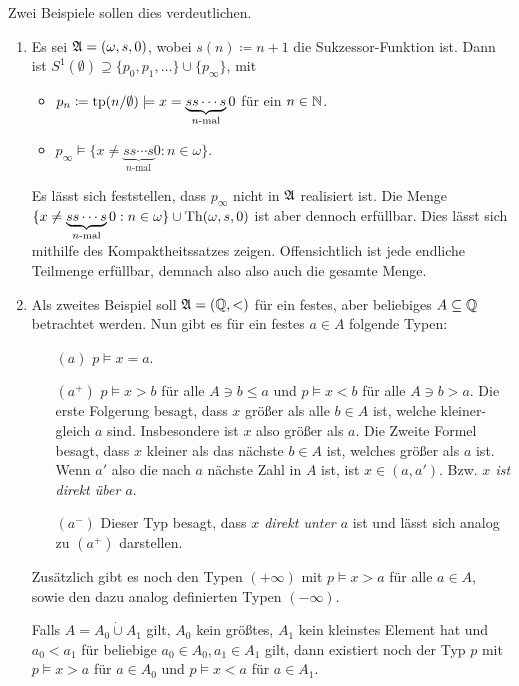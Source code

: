 Zwei Beispiele sollen dies verdeutlichen.
\begin{example}
\begin{enumerate}
	\item Es sei $\mathfrak{A}=(\omega,s,0)$, wobei $s(n)\coloneqq n+1$ die Sukzessor-Funktion ist. Dann ist $S^1(\emptyset)\supseteq\{p_0,p_1,\dots\}\cup\{p_\infty\}$, mit
	\begin{itemize}
		\item $p_n\coloneqq \operatorname{tp}(n/\emptyset)\models x=\underbrace{ss\cdots s}_{n\text{-mal}}0$ für ein $n\in \mathbb{N}$.
		\item $p_\infty\models\{x\neq\underbrace{ss\cdots s}_{n\text{-mal}}0 : n\in\omega\}$.
	\end{itemize}
	Es lässt sich feststellen, dass $p_\infty$ nicht in $\mathfrak{A}$ realisiert ist. Die Menge $\{x\neq\underbrace{ss\cdots s}_{n\text{-mal}}0 : n\in\omega\}\cup \operatorname{Th}(\omega,s,0)$ ist aber dennoch erfüllbar. Dies lässt sich mithilfe des Kompaktheitssatzes zeigen. Offensichtlich ist jede endliche Teilmenge erfüllbar, demnach also also auch die gesamte Menge.
	
	\item Als zweites Beispiel soll $\mathfrak{A}=(\mathbb{Q},<)$ für ein festes, aber beliebiges $A\subseteq \mathbb{Q}$ betrachtet werden. Nun gibt es für ein festes $a\in A$ folgende Typen:
	\begin{itemize}
		\item[$(a)$] $p\models x=a$.
		\item[$(a^+)$] $p\models x>b$ für alle $A\ni b\leq a$ und $p\models x<b$ für alle $A\ni b>a$. Die erste Folgerung besagt, dass $x$ größer als alle $b\in A$ ist, welche kleiner-gleich $a$ sind. Insbesondere ist $x$ also größer als $a$. Die Zweite Formel besagt, dass $x$ kleiner als das nächste $b\in A$ ist, welches größer als $a$ ist. Wenn $a'$ also die nach $a$ nächste Zahl in $A$ ist, ist $x\in(a,a')$. Bzw. \textit{$x$ ist direkt über $a$}.
		\item[$(a^-)$] Dieser Typ besagt, dass \textit{$x$ direkt unter $a$} ist und lässt sich analog zu $(a^+)$ darstellen.
	\end{itemize}
	Zusätzlich gibt es noch den Typen $(+\infty)$ mit $p\models x>a$ für alle $a\in A$, sowie den dazu analog definierten Typen $(-\infty)$.
	
	Falls $A=A_0\dot{\cup}A_1$ gilt, $A_0$ kein größtes, $A_1$ kein kleinstes Element hat und $a_0<a_1$ für beliebige $a_0\in A_0,a_1\in A_1$ gilt, dann existiert noch der Typ $p$ mit $p\models x>a$ für $a\in A_0$ und $p\models x<a$ für $a\in A_1$.
\end{enumerate}
\end{example}

